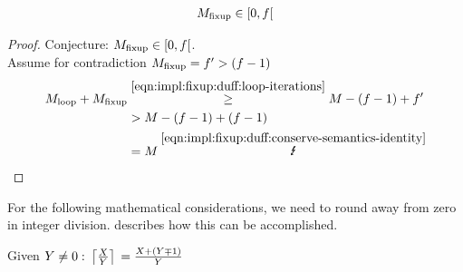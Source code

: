 \begin{equation}\label{eqn:impl:fixup:duff:fixup-interval}
\begin{aligned}
    M_{\text{fixup}} \in \lbrack0, f\lbrack
\end{aligned}
\end{equation}

\begin{proof}\label{proof:impl:fixup:duff:fixup-interval}
Conjecture: $M_{\text{fixup}} \in \lbrack0, f\lbrack$.\\

Assume for contradiction $M_{\text{fixup}} = f' > (f - 1)$
\begin{align*}
    \Mloop + \Mfixup &\overset{\ref{eqn:impl:fixup:duff:loop-iterations}}{\geq} M - (f - 1) + f' \\
    &> M - (f - 1) + (f - 1) \\
    &= M \medspace \overset{\ref{eqn:impl:fixup:duff:conserve-semantics-identity}}{\mLightning}
\end{align*}
\end{proof}

For the following mathematical considerations, we need to round away from zero in integer division.
 describes how this can be accomplished.
\begin{lem}\label{lem:impl:fixup:duff:ceil-mp}
    Given $Y \neq 0: \medspace \left\lceil{}\frac{X}{Y}\right\rceil{} = \frac{X + (Y \mp 1)}{Y}$
\end{lem}

